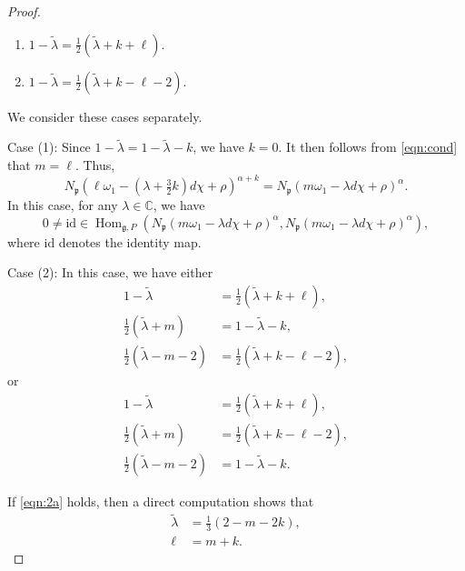 \documentclass[10pt,a4paper]{amsart}
\newcommand{\C}{\mathbb{C}}
\newcommand{\Hom}{\operatorname{Hom}}
\newcommand{\fg}{{\mathfrak g}}
\newcommand{\fp}{{\mathfrak p}}
\newcommand{\ga}{\alpha}
\newcommand{\id}{\mathrm{id}}
\newcommand{\wlambda}{\widetilde{\lambda}}
\begin{document}
\begin{proof}
\begin{enumerate}[(1)]
\item $1-\wlambda = \tfrac{1}{2}(\wlambda+k+\ell)$.

\vskip 0.05in

\item $1-\wlambda = \tfrac{1}{2}(\wlambda+k-\ell-2)$.

\vskip 0.05in

\end{enumerate}
\noindent
We consider these cases separately.

\vskip 0.1in

\noindent
Case (1): 
Since $1-\wlambda =1-\wlambda-k$,
we have $k=0$.
It then follows from \eqref{eqn:cond} that  $m=\ell$. Thus,
\begin{equation*}
N_\fp(\ell\omega_1 -(\lambda +\tfrac{3}{2}k)d\chi+\rho)^{\ga+k}=
N_\fp(m\omega_1 -\lambda d\chi+\rho)^\ga.
\end{equation*}
In this case, for any $\lambda\in \C$, we have
\begin{equation}\label{eqn:Case1}
0\neq \id \in 
\Hom_{\fg, P}
(
N_\fp(m\omega_1 -\lambda d\chi+\rho)^{\ga},
N_\fp(m\omega_1 -\lambda d\chi+\rho)^\ga
),
\end{equation}
where $\id$ denotes the identity map.
\vskip 0.1in

\noindent
Case (2): 
In this case, we have either
\begin{equation}\label{eqn:2a}
\begin{aligned}
1-\wlambda &= \tfrac{1}{2}(\wlambda+k+\ell),\\
 \tfrac{1}{2}(\wlambda+m) &=1-\wlambda-k,\\
\tfrac{1}{2}(\wlambda-m-2)&=\tfrac{1}{2}(\wlambda+k-\ell-2),
\end{aligned}
\end{equation}
or
\begin{equation}\label{eqn:2b}
\begin{aligned}
1-\wlambda &= \tfrac{1}{2}(\wlambda+k+\ell),\\
 \tfrac{1}{2}(\wlambda+m) &=\tfrac{1}{2}(\wlambda+k-\ell-2),\\
\tfrac{1}{2}(\wlambda-m-2)&=1-\wlambda-k.
\end{aligned}
\end{equation}

If \eqref{eqn:2a} holds, then a direct computation shows that
\begin{equation}\label{eqn:2a2}
\begin{aligned}
\wlambda&=\frac{1}{3}(2-m-2k),\\
\ell&=m+k.
\end{aligned}
\end{equation}


\end{proof}
\end{document}
